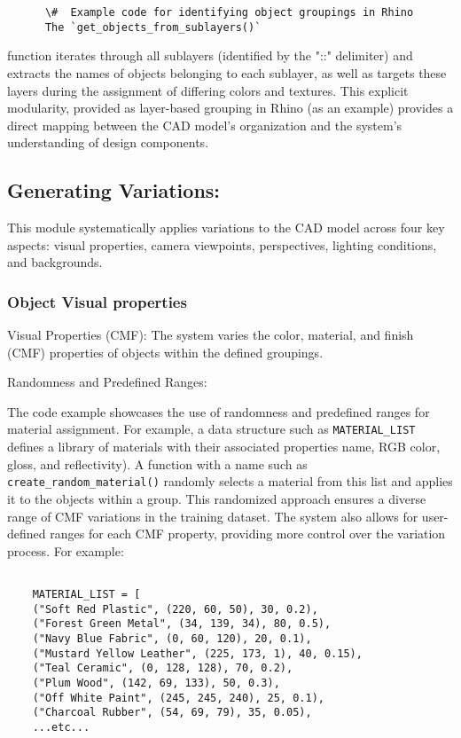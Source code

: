 \documentclass{article}
\begin{document}
    \begin{verbatim}
      \#  Example code for identifying object groupings in Rhino
      The `get_objects_from_sublayers()` 
    \end{verbatim}  

function iterates through all sublayers (identified by the "::" delimiter) and extracts the names of objects belonging to each sublayer, as well as targets these layers during the assignment of differing colors and textures. This explicit modularity, provided as layer-based grouping in Rhino (as an example) provides a direct mapping between the CAD model's organization and the system's understanding of design components.

\subsection{Generating Variations:}  This module systematically applies variations to the CAD model across four key aspects: visual properties, camera viewpoints, perspectives, lighting conditions, and backgrounds.

\subsubsection{Object Visual properties}

Visual Properties (CMF): The system varies the color, material, and finish (CMF) properties of objects within the defined groupings.

Randomness and Predefined Ranges:

The code example showcases the use of randomness and predefined ranges for material assignment. For example, a data structure such as \texttt{MATERIAL\_LIST} defines a library of materials with their associated properties name, RGB color, gloss, and reflectivity).  A function with a name such as  \texttt{create\_random\_material()} randomly selects a material from this list and applies it to the objects within a group. This randomized approach ensures a diverse range of CMF variations in the training dataset.  The system also allows for user-defined ranges for each CMF property, providing more control over the variation process. For example:

        \begin{verbatim}
        
    MATERIAL_LIST = [
    ("Soft Red Plastic", (220, 60, 50), 30, 0.2),
    ("Forest Green Metal", (34, 139, 34), 80, 0.5),
    ("Navy Blue Fabric", (0, 60, 120), 20, 0.1),
    ("Mustard Yellow Leather", (225, 173, 1), 40, 0.15),
    ("Teal Ceramic", (0, 128, 128), 70, 0.2),
    ("Plum Wood", (142, 69, 133), 50, 0.3),
    ("Off White Paint", (245, 245, 240), 25, 0.1),
    ("Charcoal Rubber", (54, 69, 79), 35, 0.05),
    ...etc...
        \end{verbatim}
\end{document}

